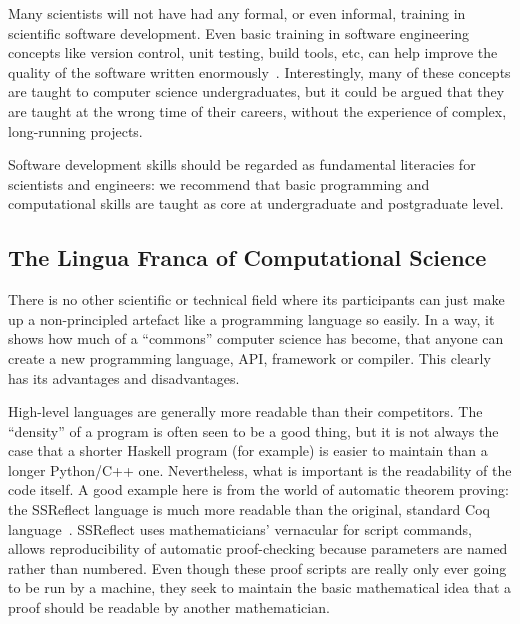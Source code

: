 \documentclass[a4paper,11pt]{article}
\begin{document}
Many scientists will not have had any formal, or even informal,
training in scientific software development. Even basic training in software engineering
concepts like version control, unit testing, build tools, etc, can help improve the
quality of the software written enormously~\cite{wilson2006}.
Interestingly, many of these concepts are taught to computer science
undergraduates, but it could be argued that they are taught at the
wrong time of their careers, without the experience of complex,
long-running projects.

 Software
development skills should be regarded as fundamental literacies for
scientists and engineers: we recommend that basic programming and
computational skills are taught as core at undergraduate and
postgraduate level.

\subsection{The Lingua Franca of Computational Science} 

There is no other scientific or technical field where its participants
can just make up a non-principled artefact like a programming language
so easily. In a way, it shows how much of a ``commons'' computer
science has become, that anyone can create a new programming language,
API, framework or compiler. This clearly has its advantages and
disadvantages.

High-level languages are generally more readable than their
competitors. The ``density'' of a program is often seen to be a good
thing, but it is not always the case that a shorter Haskell program
(for example) is easier to maintain than a longer Python/C++
one. Nevertheless, what is important is the readability of the code
itself. A good example here is from the world of automatic theorem
proving: the SSReflect language is much more readable than the
original, standard Coq language~\cite{GonthierZND13}. SSReflect uses
mathematicians' vernacular for script commands, allows reproducibility
of automatic proof-checking because parameters are named rather than
numbered.  Even though these proof scripts are really only ever going
to be run by a machine, they seek to maintain the basic mathematical
idea that a proof should be readable by another mathematician.
\end{document}

